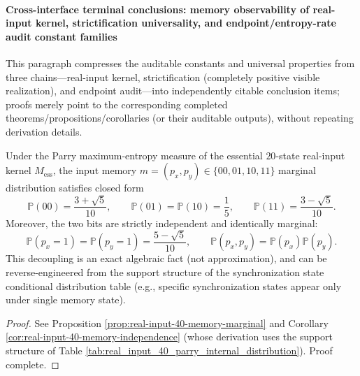
\paragraph{Cross-interface terminal conclusions: memory observability of real-input kernel, strictification universality, and endpoint/entropy-rate audit constant families}
This paragraph compresses the auditable constants and universal properties from three chains—real-input kernel, strictification (completely positive visible realization), and endpoint audit—into independently citable conclusion items; proofs merely point to the corresponding completed theorems/propositions/corollaries (or their auditable outputs), without repeating derivation details.

\begin{conclusion}\label{con:xi-terminal-real-input-parry-memory-decoupling}
Under the Parry maximum-entropy measure of the essential \(20\)-state real-input kernel \(M_{\mathrm{ess}}\), the input memory
\(m=(p_x,p_y)\in\{00,01,10,11\}\) marginal distribution satisfies closed form
\[
\mathbb{P}(00)=\frac{3+\sqrt5}{10},\qquad
\mathbb{P}(01)=\mathbb{P}(10)=\frac15,\qquad
\mathbb{P}(11)=\frac{3-\sqrt5}{10}.
\]
Moreover, the two bits are strictly independent and identically marginal:
\[
\mathbb{P}(p_x=1)=\mathbb{P}(p_y=1)=\frac{5-\sqrt5}{10},
\qquad
\mathbb{P}(p_x,p_y)=\mathbb{P}(p_x)\mathbb{P}(p_y).
\]
This decoupling is an exact algebraic fact (not approximation), and can be reverse-engineered from the support structure of the synchronization state conditional distribution table (e.g., specific synchronization states appear only under single memory state).
\end{conclusion}
\begin{proof}[Proof]
See Proposition \ref{prop:real-input-40-memory-marginal} and Corollary \ref{cor:real-input-40-memory-independence} (whose derivation uses the support structure of Table \ref{tab:real_input_40_parry_internal_distribution}). Proof complete.
\end{proof}

